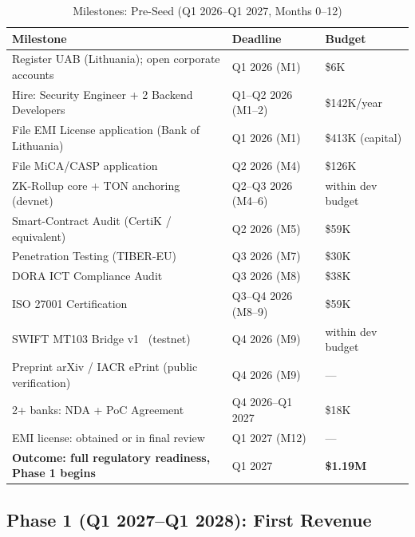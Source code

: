 \documentclass[11pt,a4paper]{article}
\begin{document}
\begin{table}[htbp]
\centering
\caption{Milestones: Pre-Seed (Q1 2026--Q1 2027, Months 0--12)}
\small
\begin{tabularx}{\linewidth}{@{}Xll@{}}
\toprule
\textbf{Milestone} & \textbf{Deadline} & \textbf{Budget} \\
\midrule
Register UAB (Lithuania); open corporate accounts               & Q1 2026 (M1)        & \$6K \\
Hire: Security Engineer + 2 Backend Developers                  & Q1--Q2 2026 (M1--2) & \$142K/year \\
File EMI License application (Bank of Lithuania)~\cite{lb_emi}                & Q1 2026 (M1)        & \$413K (capital) \\
File MiCA/CASP application~\cite{mica_reg,esma_mica}           & Q2 2026 (M4)        & \$126K \\
ZK-Rollup core + TON anchoring~\cite{plonky2,ton_wp} (devnet)                         & Q2--Q3 2026 (M4--6) & within dev budget \\
Smart-Contract Audit (CertiK / equivalent)                      & Q2 2026 (M5)        & \$59K \\
Penetration Testing (TIBER-EU)~\cite{tiber_eu}                                  & Q3 2026 (M7)        & \$30K \\
DORA ICT Compliance Audit~\cite{dora_reg}                                       & Q3 2026 (M8)        & \$38K \\
ISO 27001 Certification~\cite{iso27001}                                         & Q3--Q4 2026 (M8--9) & \$59K \\
SWIFT MT103 Bridge v1~\cite{swift_mt103} (testnet)                                 & Q4 2026 (M9)        & within dev budget \\
Preprint arXiv / IACR ePrint (public verification)              & Q4 2026 (M9)        & --- \\
2+ banks: NDA + PoC Agreement                                   & Q4 2026--Q1 2027    & \$18K \\
EMI license: obtained or in final review~\cite{lb_emi}                        & Q1 2027 (M12)       & --- \\
\midrule
\textbf{Outcome: full regulatory readiness, Phase 1 begins}     & Q1 2027             & \textbf{\$1.19M} \\
\bottomrule
\end{tabularx}
\end{table}

\subsection*{Phase 1 (Q1 2027--Q1 2028): First Revenue}
\end{document}
